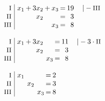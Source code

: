 \begin{equation*}
\begin{array}{l}
\setlength{\arraycolsep}{1pt}
\begin{array}{r|rcrcrcrl}
    \text{\small I } &\; x_{1} & + & 3x_{2} & + & x_{3} & = & 19 & \quad|-\text{\small III} \\
   \text{\small II } &\;       &   &  x_{2} &   &       & = &  3 &                          \\
  \text{\small III } &\;       &   &        &   & x_{3} & = &  8 &                            
\end{array}
\\ \\
\setlength{\arraycolsep}{1pt}
\begin{array}{r|rcrcrcrl}
    \text{\small I } &\; x_{1} & + & 3x_{2} &  &       & = & 11 & \quad|-3\cdot\text{\small II} \\
   \text{\small II } &\;       &   &  x_{2} &  &       & = &  3 &                               \\
  \text{\small III } &\;       &   &        &  & x_{3} & = &  8 &                                 
\end{array}
\\ \\
\setlength{\arraycolsep}{1pt}
\begin{array}{r|rcrcrcrl}
    \text{\small I } &\; x_{1} &  &       &  &       & = & 2 & \\
   \text{\small II } &\;       &  & x_{2} &  &       & = & 3 & \\
  \text{\small III } &\;       &  &       &  & x_{3} & = & 8 &   
\end{array}
\end{array}
\end{equation*}

